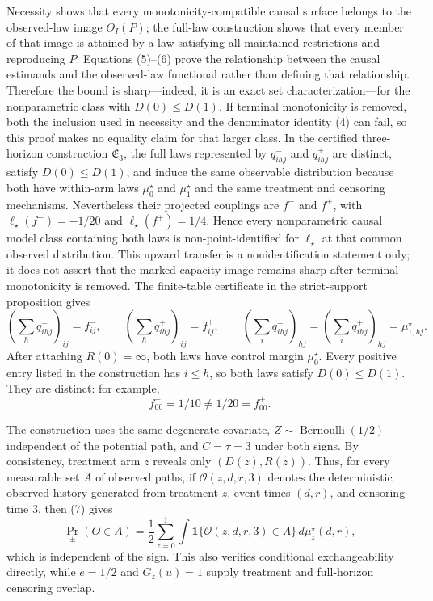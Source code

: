 Necessity shows that every monotonicity-compatible causal surface belongs to the observed-law image \(\Theta_I(P)\); the full-law construction shows that every member of that image is attained by a law satisfying all maintained restrictions and reproducing \(P\).  Equations (5)--(6) prove the relationship between the causal estimands and the observed-law functional rather than defining that relationship.  Therefore the bound is sharp---indeed, it is an exact set characterization---for the nonparametric class with \(D(0)\leq D(1)\).  If terminal monotonicity is removed, both the inclusion used in necessity and the denominator identity (4) can fail, so this proof makes no equality claim for that larger class.
In the certified three-horizon construction \(\mathfrak E_3\), the full laws represented by \(q^-_{ihj}\) and \(q^+_{ihj}\) are distinct, satisfy \(D(0)\leq D(1)\), and induce the same observable distribution because both have within-arm laws \(\mu_0^\star\) and \(\mu_1^\star\) and the same treatment and censoring mechanisms.  Nevertheless their projected couplings are \(f^-\) and \(f^+\), with \(\ell_\star(f^-)=-1/20\) and \(\ell_\star(f^+)=1/4\).  Hence every nonparametric causal model class containing both laws is non-point-identified for \(\ell_\star\) at that common observed distribution.  This upward transfer is a nonidentification statement only; it does not assert that the marked-capacity image remains sharp after terminal monotonicity is removed.
The finite-table certificate in the strict-support proposition gives
\[
 \left(\sum_hq^-_{ihj}\right)_{ij}=f^-_{ij},\qquad
 \left(\sum_hq^+_{ihj}\right)_{ij}=f^+_{ij},\qquad
 \left(\sum_iq^-_{ihj}\right)_{hj}
 =\left(\sum_iq^+_{ihj}\right)_{hj}=\mu_{1,hj}^\star.                                    \tag{7}
\]
After attaching \(R(0)=\infty\), both laws have control margin \(\mu_0^\star\).  Every positive entry listed in the construction has \(i\leq h\), so both laws satisfy \(D(0)\leq D(1)\).  They are distinct: for example,
\[
 f^-_{00}=1/10\neq1/20=f^+_{00}.                                                           \tag{8}
\]

The construction uses the same degenerate covariate, \(Z\sim\operatorname{Bernoulli}(1/2)\) independent of the potential path, and \(C=\tau=3\) under both signs.  By consistency, treatment arm \(z\) reveals only \((D(z),R(z))\).  Thus, for every measurable set \(A\) of observed paths, if \(\mathcal O(z,d,r,3)\) denotes the deterministic observed history generated from treatment \(z\), event times \((d,r)\), and censoring time \(3\), then (7) gives
\[
 \Pr_\pm(O\in A)
 =\frac12\sum_{z=0}^1
   \int\mathbf 1\{\mathcal O(z,d,r,3)\in A\}\,d\mu_z^\star(d,r),                       \tag{9}
\]
which is independent of the sign.  This also verifies conditional exchangeability directly, while \(e=1/2\) and \(G_z(u)=1\) supply treatment and full-horizon censoring overlap.

